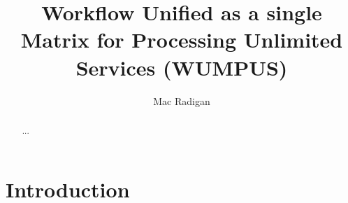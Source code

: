 \documentclass{article}[11pt]
\begin{document}
\title{Workflow Unified as a single Matrix for Processing Unlimited Services (WUMPUS)}
\author{Mac Radigan}
\date{} %
\doublespacing

\maketitle

\begin{abstract}\centering
...
\end{abstract}

\tableofcontents
\listofalgorithms
\newpage

\section{Introduction}
\end{document}

